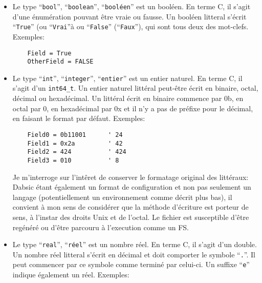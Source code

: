 \documentclass[a5paper, 12pt]{book}
\begin{document}
\begin{itemize}
  \item Le type ``\verb!bool!'', ``\verb!boolean!'', ``\verb!booléen!'' est un booléen. En terme C, il s'agit
    d'une énumération pouvant être vraie ou fausse. Un booléen
    litteral s'écrit ``\verb!True!'' (ou ``\verb!Vrai!''à ou ``\verb!False!'' (``\verb!Faux!''), qui sont tous deux
    des mot-clefs. Exemples:\\

\begin{verbatim}
    Field = True
    OtherField = FALSE
\end{verbatim}
\vspace{\baselineskip}

  \item Le type ``\verb!int!'', ``\verb!integer!'', ``\verb!entier!'' est un entier naturel. En terme C, il
    s'agit d'un \verb!int64_t!. Un entier naturel littéral peut-être
    écrit en binaire, octal, décimal ou hexadécimal. Un littéral
    écrit en binaire commence par 0b, en octal par 0, en hexadécimal
    par 0x et il n'y a pas de préfixe pour le décimal, en faisant
    le format par défaut.
    Exemples:\\

\begin{verbatim}
    Field0 = 0b11001      ' 24
    Field1 = 0x2a         ' 42
    Field2 = 424          ' 424
    Field3 = 010          ' 8
\end{verbatim}
	\vspace{\baselineskip}

    Je m'interroge sur l'intêret de conserver le formatage original
    des littéraux: Dabsic étant également un format de configuration
    et non pas seulement un langage (potentiellement un environnement
    comme décrit plus bas), il convient à mon sens de considérer
    que la méthode d'écriture est porteur de sens, à l'instar des
    droits Unix et de l'octal. Le fichier est susceptible d'être
    regénéré ou d'être parcouru à l'execution comme un FS.
	\vspace{\baselineskip}

  \item Le type ``\verb!real!'', ``\verb!réel!'' est un nombre réel. En terme C, il s'agit
    d'un double. Un nombre réel litteral s'écrit en décimal et doit
    comporter le symbole ``\verb!.!''. Il peut commencer par ce symbole comme
    terminé par celui-ci. Un suffixe ``\verb!e!'' indique également un réel.
    Exemples:\\


\end{itemize}
\end{document}
